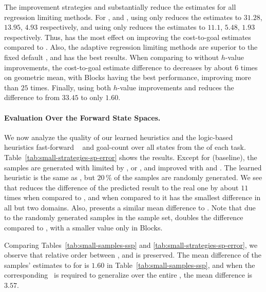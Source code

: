 

The improvement strategies \hmin and \hvfc substantially reduce the estimates for all regression limiting methods. For , \facts and \meanfx, using only \hmin reduces the estimates to $31.28$, $13.95$, $4.93$ respectively, and using only \hvfc reduces the estimates to $11.1$, $5.48$, $1.93$ respectively. Thus, \hvfc has the most effect on improving the cost-to-goal estimates compared to \hmin.
Also, the adaptive regression limiting methods are superior to the fixed default , and \meanfx has the best results. When comparing  to \meanfx without $h$-value improvements, the cost-to-goal estimate difference to \hstar decreases by about $6$ times on geometric mean, with Blocks having the best performance, improving more than $25$ times. Finally, using both $h$-value improvements and \meanfx reduces the difference to \hstar from $33.45$ to only $1.60$.

\paragraph{Evaluation Over the Forward State Spaces.}

We now analyze the quality of our learned heuristics and the logic-based heuristics fast-forward \hff~\cite{Hoffmann.Nebel/2001} and goal-count \hgc over all states from the \fssp of each task. Table~\ref{tab:small-strategies-sp-error} shows the results. Except for \hnnbase (baseline), the samples are generated with \bfsrw limited by , \facts or \meanfx, and improved with \hmin and \hvfc. The learned heuristic \hnnrs is the same as \hnnbfsrwl{\meanfx}, but $20\,\%$ of the samples are randomly generated. We see that \hnnbfsrwl{\meanfx} reduces the difference of the predicted result to the real one by about $11$ times when compared to \hnnbase, and when compared to \hgc it has the smallest difference in all but two domains. Also, \hnnbfsrwl{\meanfx} presents a similar mean difference to \hff. Note that due to the randomly generated samples in the sample set, \hnnrs doubles the difference compared to \hnnbfsrwl{\meanfx}, with a smaller value only in Blocks.



Comparing Tables~\ref{tab:small-samples-ssp} and \ref{tab:small-strategies-sp-error}, we observe that relative order between , \facts and \meanfx is preserved. The mean difference of the samples' estimates to \hstar for \meanfx is $1.60$ in Table~\ref{tab:small-samples-ssp}, and when the corresponding~\hnnbfsrwl{\meanfx} is required to generalize over the entire \fssp, the mean difference is $3.57$.

